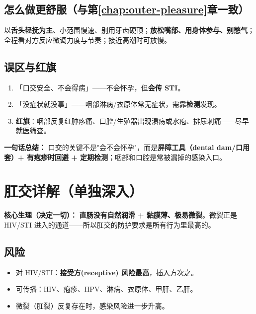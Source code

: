 \section{怎么做更舒服（与第\ref{chap:outer-pleasure}章一致）}

以\textbf{舌头轻抚为主}、小范围慢速、别用牙齿硬顶；\textbf{放松嘴部、用身体参与、别憋气}；全程看对方反应微调力度与节奏；接近高潮时可放慢。

\section{误区与红旗}

\begin{enumerate}[leftmargin=2em,itemsep=0.3em]
  \item 「口交安全、不会得病」——不会怀孕，但\textbf{会传 STI}。
  \item 「没症状就没事」——咽部淋病/衣原体常无症状，需靠\textbf{检测}发现。
  \item \textbf{红旗}：咽部反复红肿疼痛、口腔/生殖器出现溃疡或水疱、排尿刺痛——尽早就医筛查。
\end{enumerate}

\vspace{1em}
\noindent\textbf{一句话总结：} 口交的关键不是"会不会怀孕"，而是\textbf{屏障工具（dental dam/口用套）+ 有疱疹时回避 + 定期检测}；咽部和口腔是常被漏掉的感染入口。

\chapter{肛交详解（单独深入）}
\label{chap:anal}

\noindent\textbf{核心生理（决定一切）：} \textbf{直肠没有自然润滑 + 黏膜薄、极易微裂}。微裂正是 HIV/STI 进入的通道——所以肛交的防护要求是所有行为里最高的。

\section{风险}

\begin{itemize}[leftmargin=2em,itemsep=0.3em]
  \item 对 HIV/STI：\textbf{接受方(receptive) 风险最高}，插入方次之。
  \item 可传播：HIV、疱疹、HPV、淋病、衣原体、甲肝、乙肝。
  \item 微裂（肛裂）反复存在时，感染风险进一步升高。
\end{itemize}

